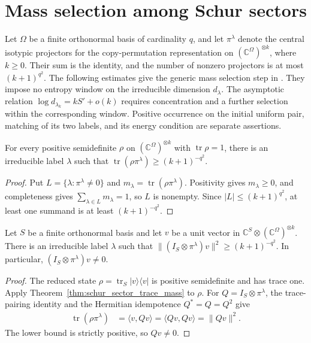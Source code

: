 \section{Mass selection among Schur sectors}
\label{sec:schur_sector_mass}

Let $\Omega$ be a finite orthonormal basis of cardinality $q$, and let
$\pi^\lambda$ denote the central isotypic projectors for the copy-permutation
representation on $(\mathbb C^\Omega)^{\otimes k}$, where $k\ge0$.
Their sum is the identity, and the number of nonzero projectors is at most
$(k+1)^{q^2}$.
The following estimates give the generic mass selection step in
\cite[Section~7]{OpenAI2026AreaLaw}.
They impose no entropy window on the irreducible dimension $d_\lambda$.
The asymptotic relation $\log d_{\lambda_k}=kS'+o(k)$ requires concentration
and a further selection within the corresponding window. Positive occurrence
on the initial uniform pair, matching of its two labels, and its energy
condition are separate assertions.

\begin{theorem}
\label{thm:schur_sector_trace_mass}
\leanok
For every positive semidefinite $\rho$ on
$(\mathbb C^\Omega)^{\otimes k}$ with $\operatorname{tr}\rho=1$, there is an
irreducible label $\lambda$ such that
$\operatorname{tr}(\rho\pi^\lambda)\ge(k+1)^{-q^2}$.
\end{theorem}
\begin{proof}
\leanok
Put $L=\{\lambda:\pi^\lambda\ne0\}$ and
$m_\lambda=\operatorname{tr}(\rho\pi^\lambda)$. Positivity gives
$m_\lambda\ge0$, and completeness gives
$\sum_{\lambda\in L}m_\lambda=1$, so $L$ is nonempty.
Since $|L|\le(k+1)^{q^2}$, at least one summand is at least
$(k+1)^{-q^2}$.
\end{proof}

\begin{theorem}
\label{thm:schur_sector_norm_mass}
\leanok
{}
Let $S$ be a finite orthonormal basis and let $v$ be a unit vector in
$\mathbb C^S\otimes(\mathbb C^\Omega)^{\otimes k}$.
There is an irreducible label $\lambda$ such that
$\|(I_S\otimes\pi^\lambda)v\|^2\ge(k+1)^{-q^2}$.
In particular, $(I_S\otimes\pi^\lambda)v\ne0$.
\end{theorem}
\begin{proof}
\leanok
{}
The reduced state $\rho=\operatorname{tr}_S|v\rangle\langle v|$ is positive
semidefinite and has trace one. Apply
Theorem~\ref{thm:schur_sector_trace_mass} to $\rho$.
For $Q=I_S\otimes\pi^\lambda$, the trace-pairing identity and the Hermitian
idempotence $Q^*=Q=Q^2$ give
\begin{align}
 \operatorname{tr}(\rho\pi^\lambda)
 &=\langle v,Qv\rangle=\langle Qv,Qv\rangle=\|Qv\|^2.
 \label{eq:schur_sector_marginal_norm}
\end{align}
The lower bound is strictly positive, so $Qv\ne0$.
\end{proof}
